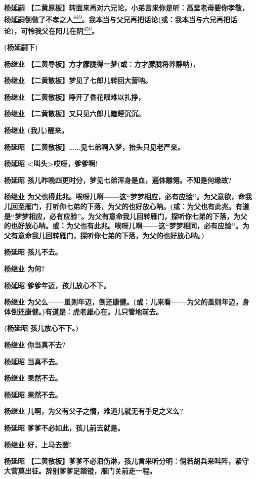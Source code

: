 \textbf{杨延嗣
【二黄原板】转面来再对六兄论，小弟言来你是听：高堂老母要你孝敬，杨延嗣倒做了不孝之人}\protect\hyperlink{fn449}{\textsuperscript{449}}\textbf{。我本当与父兄再把话论(或：我本当与六兄再把话论)，可怜我父在阳儿在阴}\protect\hyperlink{fn450}{\textsuperscript{450}}\textbf{。}

\textbf{(杨延嗣下)}

\textbf{杨继业 【二黄导板】方才朦胧得一梦(或：方才朦胧将养静呐)，}

\textbf{杨继业 【二黄散板】梦见了七郎儿转回大营呐。}

\textbf{杨继业 【二黄散板】睁开了昏花眼难以扎挣，}

\textbf{杨继业 【二黄散板】又只见六郎儿瞌睡沉沉。}

\textbf{杨继业 (我儿)醒来。}

\textbf{杨延昭
【二黄散板】\ldots{}\ldots{}见七弟啊入梦，抬头只见老严亲。}

\textbf{杨延昭 \textless{}叫头\textgreater{}哎呀，爹爹啊!}

\textbf{杨延昭
孩儿昨晚四更时分，梦见七弟浑身是血，遍体雕翎。不知是何缘故?}

\textbf{杨继业
为父也得此兆。唉呀儿啊------这``梦梦相应，必有应验''。为父意欲，命我儿回至雁门，打听你七弟的下落，为父的也好放心呐。(或：为父也有此兆。有道是``梦梦相应，必有应验''。为父有意命我儿回转雁门，探听你七弟的下落，为父的也好放心呐。或：为父也有此兆。唉呀儿啊------这``梦梦相同，必有应验''。为父有意命我儿回转雁门，探听你七弟的下落，为父的也好放心呐。)}

\textbf{杨延昭 孩儿不去。}

\textbf{杨继业 为何?}

\textbf{杨延昭 爹爹年迈，孩儿放心不下。}

\textbf{杨继业
为父么------虽则年迈，倒还康健。(或：儿来看------为父的虽则年迈，身体倒还康健。)有道是：虎老雄心在。儿只管地前去。}

\textbf{(杨延昭 孩儿放心不下。)}

\textbf{杨继业 你当真不去?}

\textbf{杨延昭 当真不去。}

\textbf{杨继业 果然不去。}

\textbf{杨延昭 果然不去。}

\textbf{杨继业 儿啊，为父有父子之情，难道儿就无有手足之义么?}

\textbf{杨延昭 爹爹不必如此，孩儿前去就是。}

\textbf{杨继业 好，上马去罢!}

\textbf{杨延昭
【二黄散板】爹爹不必泪伤淋，孩儿言来听分明：倘若胡兵来叫阵，紧守大营莫出征。辞别爹爹足踏镫，雁门关前走一程。}

